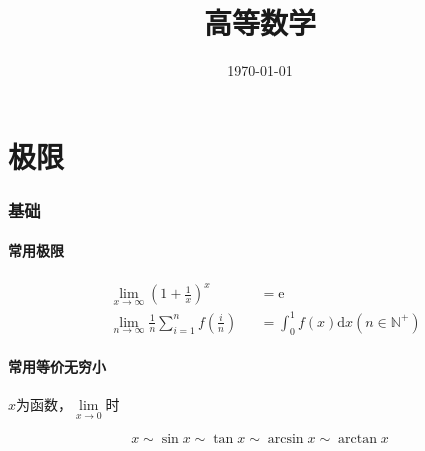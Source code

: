 \documentclass{article}
\title{高等数学}
\author{}
\date{\today}
\begin{document}
\hypersetup{
    hidelinks,
    allcolors = black,
    breaklinks = true
}

\newtheorem{definition}{Definition}[subsection]
\newtheorem{theorem}{Theorem}[subsection]
\newtheorem{corollary}{Corollary}[theorem]
\renewcommand{\proofname}{\indent\bf Proof}

\def\e{\mathrm e}
\def\i{\mathrm i}
\def\d{\mathrm d}
\def\C{\mathrm C}
\def\vecv{\vec{\mathrm v}}
\def\sr{\mathbb R}
\def\sn{\mathbb N}
\def\snp{\mathbb N^+}
\def\sc{\mathbb C}
\def\sz{\mathbb Z}

\newcommand{\abs}[1]{\left|#1\right|}
\newcommand{\p}[1]{\left(#1\right)}
\newcommand{\jacobi}[2]{\frac{\partial\p{#1}}{\partial\p{#2}}}

\begin{titlepage}
    \maketitle
\end{titlepage}

\tableofcontents
\newpage

\part{极限}

\section{基础}

\subsection{常用极限}

\[\begin{aligned}
         & \lim_{x\to\infty}{\p{1+\frac1x}^x}                  &  & =\e                            \\
         & \lim_{n\to\infty}{\frac1n\sum_{i=1}^nf\p{\frac in}} &  & =\int_0^1f\p x\d x\p{n\in\snp}
    \end{aligned}\]

\subsection{常用等价无穷小}

$x$为函数，$\lim\limits_{x\to0}$时

\[x\sim\sin x\sim\tan x\sim\arcsin x\sim\arctan x\]
\end{document}
